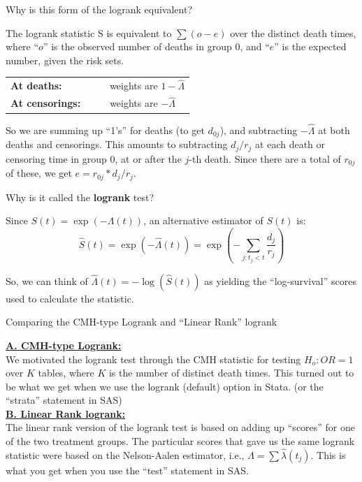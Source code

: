 \documentclass[envcountsect, 10pt, portrait, palatino]{beamer}
\begin{document}
\begin{frame}{Why is this form of the logrank equivalent?}

The logrank statistic S is equivalent to $\sum (o-e)$ over
the distinct death times, where ``$o$'' is the observed number of
deaths in group 0, and ``$e$'' is the expected number, given
the risk sets.
\begin{center}
\begin{tabular}{ll}
{\bf At deaths:} & weights are $1-\hat\Lambda$\\
{\bf At censorings:}~~~~ & weights are $-\hat\Lambda$
\end{tabular}
\end{center}

So we are summing up ``1's'' for deaths (to get $d_{0j}$), and subtracting
$-\hat\Lambda$ at both deaths and censorings.  This amounts
to subtracting $d_j/r_j$ at each death or censoring
time in group 0, at or after the $j$-th death.  Since there are
a total of $r_{0j}$ of these, we get $e = r_{0j} * d_j/r_j$.

\end{frame}
\begin{frame}{Why is it called the {\bf logrank} test?}

Since $S(t) = \exp(-\Lambda(t))$, an alternative estimator of $S(t)$ is:
\[  \hat{S}(t) = \exp\left (-\hat\Lambda(t)\right ) = \exp\left ( - \sum_{j: t_j<t} \frac{d_j}{r_j}\right )\]

So,  we can think of $\hat\Lambda(t)=-\log(\hat{S}(t))$ as yielding the
``log-survival'' scores used to calculate the statistic.
\end{frame}

\begin{frame}{Comparing the CMH-type Logrank and ``Linear Rank'' logrank}

\underline{\bf A. CMH-type Logrank:}\\[1ex]
We motivated the logrank test through the CMH statistic for
testing $H_o: OR=1$ over $K$ tables, where $K$ is the number
of distinct death times.  This turned out to be what we get
when we use the logrank (default) option in Stata. (or the
``{\sc strata}'' statement in SAS)
~\\[2ex]
\underline{\bf B. Linear Rank logrank:}\\[1ex]
The linear rank version of the logrank test is based
on adding up ``scores'' for one of the two treatment groups.
The particular scores that gave us the same logrank statistic were
based on the Nelson-Aalen estimator, i.e.,
$\hat\Lambda = \sum \hat\lambda(t_j)$.
This is what you get when you use the ``{\sc test}''
statement in SAS.
\end{frame}
\end{document}
